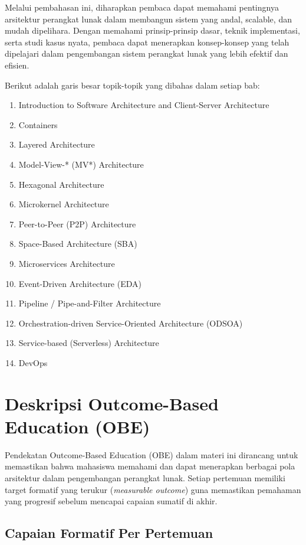 Melalui pembahasan ini, diharapkan pembaca dapat memahami pentingnya arsitektur perangkat lunak dalam membangun sistem yang andal, scalable, dan mudah dipelihara. Dengan memahami prinsip-prinsip dasar, teknik implementasi, serta studi kasus nyata, pembaca dapat menerapkan konsep-konsep yang telah dipelajari dalam pengembangan sistem perangkat lunak yang lebih efektif dan efisien.

Berikut adalah garis besar topik-topik yang dibahas dalam setiap bab:
\begin{enumerate}
\item Introduction to Software Architecture and Client-Server Architecture
\item Containers
\item Layered Architecture
\item Model-View-* (MV*) Architecture
\item Hexagonal Architecture
\item Microkernel Architecture
\item Peer-to-Peer (P2P) Architecture

\item Space-Based Architecture (SBA)
\item Microservices Architecture
\item Event-Driven Architecture (EDA)
\item Pipeline / Pipe-and-Filter Architecture
\item Orchestration-driven Service-Oriented Architecture (ODSOA)
\item Service-based (Serverless) Architecture
\item DevOps
\end{enumerate}


\section{Deskripsi Outcome-Based Education (OBE)}

Pendekatan Outcome-Based Education (OBE) dalam materi ini dirancang untuk memastikan bahwa mahasiswa memahami dan dapat menerapkan berbagai pola arsitektur dalam pengembangan perangkat lunak. Setiap pertemuan memiliki target formatif yang terukur (\textit{measurable outcome}) guna memastikan pemahaman yang progresif sebelum mencapai capaian sumatif di akhir.

\subsection{Capaian Formatif Per Pertemuan}


